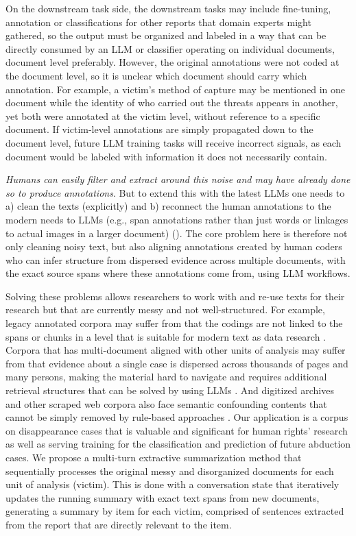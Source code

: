 \documentclass{article}
\begin{document}
On the downstream task side, the downstream tasks may include fine-tuning, annotation or classifications for other reports that domain experts might gathered, so the output must be organized and labeled in a way that can be directly consumed by an LLM or classifier operating on individual documents, document level preferably. However, the original annotations were not coded at the document level, so it is unclear which document should carry which annotation. For example, a victim's method of capture may be mentioned in one document while the identity of who carried out the threats appears in another, yet both were annotated at the victim level, without reference to a specific document. If victim-level annotations are simply propagated down to the document level, future LLM training tasks will receive incorrect signals, as each document would be labeled with information it does not necessarily contain.

\emph{Humans can easily filter and extract around this noise and may have already done so to produce annotations}.  But to extend this with the latest LLMs one needs to a) clean the texts (explicitly) and b) reconnect the human annotations to the modern needs to LLMs (e.g., span annotations rather than just words or linkages to actual images in a larger document) (\cite{olsen-etal-2024-socio}). The core problem here is therefore not only cleaning noisy text, but also aligning annotations created by human coders who can infer structure from dispersed evidence across multiple documents, with the exact source spans where these annotations come from, using LLM workflows.

Solving these problems allows researchers to work with and re-use texts for their research but that are currently messy and not well-structured. For example, legacy annotated corpora may suffer from that the codings are not linked to the spans or chunks in a level that is suitable for modern text as data research \cite{Escott2018}. Corpora that has multi-document aligned with other units of analysis may suffer from that evidence about a single case is dispersed across thousands of pages and many persons, making the material hard to navigate and requires additional retrieval structures that can be solved by using LLMs \cite{Gibbs_etal2010}. And digitized archives and other scraped web corpora also face semantic confounding contents that cannot be simply removed by rule-based approaches \cite{HurtadoBodell_etal2022, Molina_etal2025}. Our application is a corpus on disappearance cases that is valuable and significant for human rights' research as well as serving training for the classification and prediction of future abduction cases. We propose a multi-turn extractive summarization method that sequentially processes the original messy and disorganized documents for each unit of analysis (victim).  This is done with a conversation state that iteratively updates the running summary with exact text spans from new documents, generating a summary by item for each victim, comprised of sentences extracted from the report that are directly relevant to the item.
\end{document}
